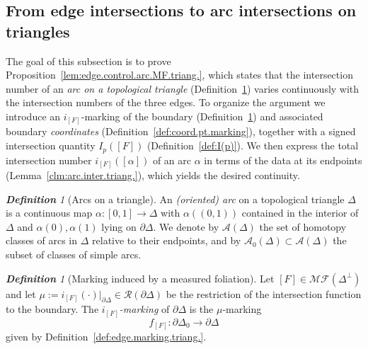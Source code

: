 \documentclass[11pt, letterpaper]{amsart}
\theoremstyle{definition}
\theoremstyle{remark}
\newtheorem{definition}[theorem]{\rm\bf Definition}
\newcommand{\cR}{\mathcal{R}}
\newcommand{\cA}{\mathcal{A}}
\newcommand{\DEF}{} \newcommand{\WARN}{\textcolor{red}} \newcommand{\ALT}{\textcolor{brown}} \newcommand{\TODO}{\textcolor{teal}} %
\numberwithin{equation}{section}
\begin{document}
\subsection{From edge intersections to arc intersections on triangles}
\label{subsec:MF.triang.}

The goal of this subsection is to prove Proposition~\ref{lem:edge.control.arc.MF.triang.}, which states that the intersection number of an \emph{arc on a topological triangle} (Definition~\ref{def:arc.triang.}) varies continuously with the intersection numbers of the three edges.
To organize the argument we introduce an \(i_{[F]}\)-marking of the boundary (Definition~\ref{def:i-marking}) and associated boundary \emph{coordinates} (Definition~\ref{def:coord.pt.marking}), together with a signed intersection quantity \(I_p([F])\) (Definition~\ref{def:I(p)}).
We then express the total intersection number \(i_{[F]}([\alpha])\) of an arc \(\alpha\) in terms of the data at its endpoints (Lemma~\ref{clm:arc.inter.triang.}), which yields the desired continuity.

\begin{definition}[Arcs on a triangle]
\label{def:arc.triang.}
An \DEF{\em (oriented) arc} on a topological triangle \(\Delta\) is a continuous map \(\alpha:[0,1]\to\Delta\) with \(\alpha((0,1))\) contained in the interior of $\Delta$ and \(\alpha(0),\alpha(1)\) lying on \(\partial\Delta\).
We denote by \(\cA(\Delta)\) the set of homotopy classes of arcs in \(\Delta\) relative to their endpoints, and by \(\cA_0(\Delta)\subset\cA(\Delta)\) the subset of classes of simple arcs.
\end{definition}

\begin{definition}[Marking induced by a measured foliation]
\label{def:i-marking}
Let \([F]\in\mathcal{MF}(\Delta^{\perp})\) and let \(\mu:=i_{[F]}(\cdot)\vert_{\partial\Delta}\in\cR(\partial\Delta)\) be the restriction of the intersection function to the boundary.
The \DEF{\em \(i_{[F]}\)-marking} of \(\partial\Delta\) is the \(\mu\)-marking
\[
f_{[F]}:\partial\Delta_0\longrightarrow\partial\Delta
\]
given by Definition~\ref{def:edge.marking.triang.}.
\end{definition}
\end{document}
